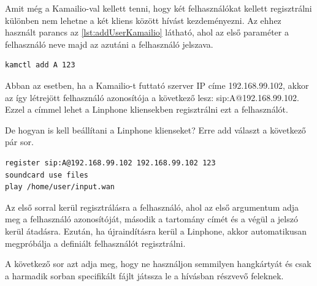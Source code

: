 Amit még a Kamailio-val kellett tenni, hogy két felhasználókat kellett regisztrálni
különben nem lehetne a két kliens között hívást kezdeményezni. Az ehhez használt parancs
az \ref{lst:addUserKamailio} látható, ahol az első paraméter a felhasználó neve majd az azutáni a felhasználó jelszava.

\begin{lstlisting}[caption=Felhasználó hozzáadása Kamailio-hoz, label=lst:addUserKamailio]
kamctl add A 123
\end{lstlisting}

Abban az esetben, ha a Kamailio-t futtató szerver IP címe 192.168.99.102, akkor az 
így létrejött felhasználó azonosítója a következő lesz: sip:A@192.168.99.102. Ezzel a
címmel lehet a Linphone kliensekben regisztrálni ezt a felhasználót. 

De hogyan is kell beállítani a Linphone klienseket? Erre add választ a következő 
pár sor. 

\begin{lstlisting}[caption=Linphone beállítása, label=lst:setupLinphone]
register sip:A@192.168.99.102 192.168.99.102 123
soundcard use files
play /home/user/input.wan
\end{lstlisting}

Az első sorral kerül regisztrálásra a felhasználó, ahol az első argumentum adja meg a 
felhasználó azonosítóját, második a tartomány címét és a végül a jelszó kerül átadásra. 
Ezután, ha újraindításra kerül a Linphone, akkor automatikusan megpróbálja a definiált
felhasználót regisztrálni. 

A következő sor azt adja meg, hogy ne használjon semmilyen hangkártyát és csak a 
harmadik sorban specifikált fájlt játssza le a hívásban részvevő feleknek.  \\

